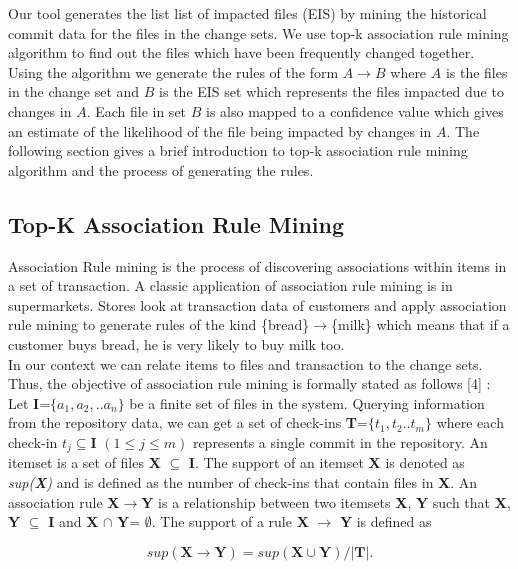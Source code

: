 Our tool generates the list list of impacted files (EIS) by mining the historical commit data for the files in the change sets. We use top-k association rule mining algorithm to find out the files which have been frequently changed together. Using the algorithm we generate the rules of the form $A \rightarrow B$ where $A$ is the files in the change set and $B$ is the EIS set which represents the files impacted due to changes in $A$. Each file in set $B$ is also mapped to a confidence value which gives an estimate of the likelihood of the file being impacted by changes in $A$. The following section gives a brief introduction to top-k association rule mining algorithm and the process of generating the rules.\\  

\subsection{Top-K Association Rule Mining}

Association Rule mining is the process of discovering associations within items in a set of transaction. A classic application of association rule mining is in supermarkets. Stores look at transaction data of customers and apply association rule mining to generate rules of the kind \{bread\}$\rightarrow$\{milk\} which means that if a customer buys bread, he is very likely to buy milk too.\\
In our context we can relate items to files and transaction to the change sets. Thus, the objective of association rule mining is formally stated as follows [4] :\\
Let \textbf{I}=$\{a_{1},a_{2},..a_{n}\}$ be a finite set of files in the system. Querying information from the repository data, we can get a set of check-ins \textbf{T}=$\{t_{1},t_{2}..t_{m}\}$ where each check-in $t_{j}\subseteq\textbf{I}$ $(1 \le j \le m)$ represents a single commit in the repository. An itemset is a set of files \textbf{X} $\subseteq$ \textbf{I}. The support of an itemset \textbf{X} is denoted as \textit{sup(\textbf{X})} and is defined as the number of check-ins that contain files in \textbf{X}. An association rule \textbf{X}$\rightarrow$\textbf{Y} is a relationship between two itemsets \textbf{X}, \textbf{Y} such that \textbf{X}, \textbf{Y} $\subseteq$ \textbf{I} and \textbf{X} $\cap$ \textbf{Y}= $\emptyset$. The support of a rule \textbf{X} $\rightarrow$ \textbf{Y} is defined as 

\begin{equation}
\textit{sup}(\textbf{X} \rightarrow \textbf{Y}) = \textit{sup}(\textbf{X}\cup\textbf{Y}) / |\textbf{T}|.
\end{equation}
 

